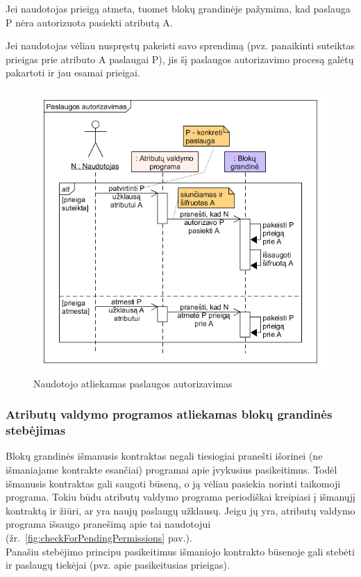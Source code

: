 Jei naudotojas prieigą atmeta, tuomet blokų grandinėje pažymima, kad paslauga P nėra autorizuota pasiekti atributą A.

Jei naudotojas vėliau nuspręstų pakeisti savo sprendimą (pvz. panaikinti suteiktas prieigas prie atributo A paslaugai P),
jis šį paslaugos autorizavimo procesą galėtų pakartoti ir jau esamai prieigai.


\begin{figure}[h]
    \centering
    \includegraphics[scale=0.65]{img/givePermissions}
    \caption{Naudotojo atliekamas paslaugos autorizavimas}
    \label{fig:givePermissions}
\end{figure}

\subsubsection{Atributų valdymo programos atliekamas blokų grandinės stebėjimas} \label{BCIDM:blockchainMonitoring}

Blokų grandinės išmanusis kontraktas negali tiesiogiai pranešti išorinei (ne išmaniajame kontrakte esančiai) programai
apie įvykusius pasikeitimus. Todėl išmanusis kontraktas gali saugoti būseną, o ją vėliau pasiekia norinti taikomoji programa.
Tokiu būdu atributų valdymo programa periodiškai kreipiasi į išmanųjį kontraktą ir žiūri, ar yra naujų paslaugų užklausų. Jeigu jų yra,
atributų valdymo programa išsaugo pranešimą apie tai naudotojui (žr.\hypertarget{fig:checkForPendingPermissions}{~\ref{fig:checkForPendingPermissions} pav.}).\\
Panašiu stebėjimo principu pasikeitimus išmaniojo kontrakto būsenoje gali stebėti ir paslaugų tiekėjai
(pvz. apie pasikeitusias prieigas).

